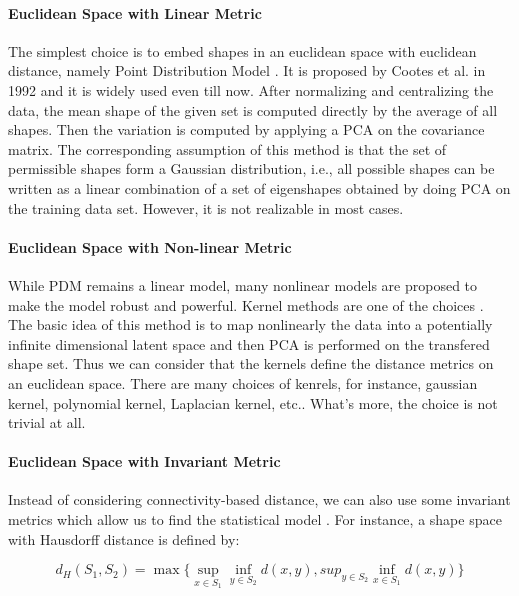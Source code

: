 \documentclass[11pt]{article}
\begin{document}
\paragraph{Euclidean Space with Linear Metric}
The simplest choice is to embed shapes in an euclidean space with euclidean distance, namely Point Distribution Model \cite{Cootes92trainingmodels}.
It is proposed by Cootes et al. in 1992 and it is widely used even till now.
After normalizing and centralizing the data, the mean shape of the given set is computed directly by the average of all shapes.
Then the variation is computed by applying a PCA on the covariance matrix.
The corresponding assumption of this method is that the set of permissible shapes
form a Gaussian distribution, i.e., all possible shapes can be written as a linear combination of a set of eigenshapes obtained by doing PCA on the training data set.
However, it is not realizable in most cases.

\paragraph{Euclidean Space with Non-linear Metric}
While PDM remains a linear model, many nonlinear models are proposed to make the model robust and powerful.
Kernel methods are one of the choices \cite{rathi2006comparative}. The basic idea of this method is to map nonlinearly the data into a potentially infinite dimensional latent space and then PCA is performed on the transfered shape set.
Thus we can consider that the kernels define the distance metrics on an euclidean space. 
There are many choices of kenrels, for instance, gaussian kernel, polynomial kernel, Laplacian kernel, etc.. What's more, the choice is not trivial at all.

\paragraph{Euclidean Space with Invariant Metric}

Instead of considering connectivity-based distance, we can also use some invariant metrics which allow us to find the statistical model \cite{rumpf2015variational}.
For instance, a shape space with Hausdorff distance is defined by:

\vspace{-1em}
$$
d_H (S_1, S_2) = \max \{\sup_{x \in S_1} \inf_{y \in S_2} d(x,y), sup_{y \in S_2} \inf_{x \in S_1} d(x,y)\}
$$
\vspace{-1em}
\end{document}
